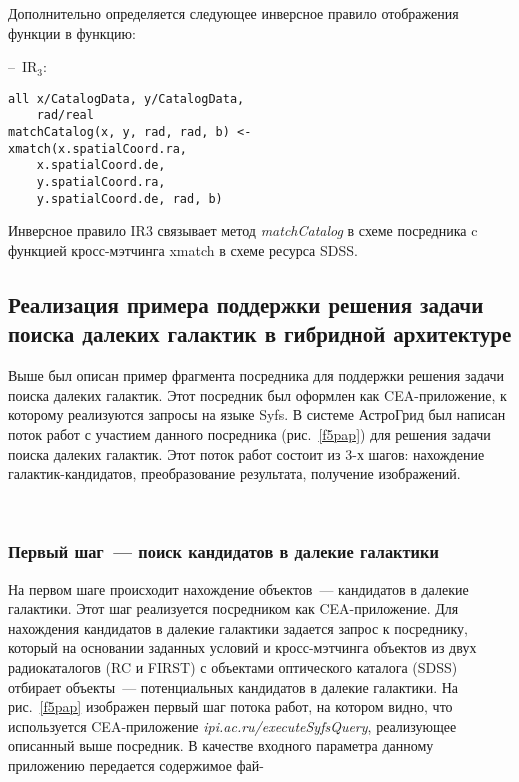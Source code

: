 \begin{multicols}{2}
     Дополнительно определяется следующее инверсное правило отображения
функции в функцию:

--~IR$_3$:
\begin{verbatim}
all x/CatalogData, y/CatalogData,
    rad/real
matchCatalog(x, y, rad, rad, b) <-
xmatch(x.spatialCoord.ra,
    x.spatialCoord.de,
    y.spatialCoord.ra,
    y.spatialCoord.de, rad, b)
\end{verbatim}

     Инверсное правило IR3 связывает метод \textit{matchCatalog} в схеме посредника c
функцией кросс-мэт\-чин\-га xmatch в схеме ресурса SDSS.


\subsection{Реализация примера поддержки решения задачи поиска далеких галактик в
гибридной архитектуре}

     Выше был описан пример фрагмента посредника для поддержки решения задачи
поиска далеких галактик. Этот посредник был оформлен как CEA-при\-ло\-же\-ние, к
которому реализуются запросы на языке Syfs. В системе АстроГрид был написан
поток работ с участием данного посредника (рис.~\ref{f5pap}) для решения задачи поиска
далеких галактик. Этот поток работ состоит из 3-х шагов: нахождение
галактик-кандидатов, преобразование результата, получение изображений.

\begin{figure*}
\vspace*{1pt}
\begin{center}
\mbox{%
\epsfxsize=141.166mm
}
\end{center}
\vspace*{-9pt}
\end{figure*}


\subsubsection{Первый шаг~--- поиск кандидатов в далекие галактики}

     На первом шаге происходит нахождение объектов~--- кандидатов в далекие
галактики. Этот шаг реализуется посредником как CEA-приложение. Для нахождения
кандидатов в далекие галактики задается запрос к посреднику, который на основании
заданных условий и кросс-мэтчинга объектов из двух радиокаталогов (RC и FIRST) с
объектами оптического каталога (SDSS) отбирает объекты~--- потенциальных кандидатов
в далекие галактики.
     На рис.~\ref{f5pap} изображен первый шаг потока работ, на котором видно, что
используется CEA-приложение \textit{ipi.ac.ru/executeSyfsQuery}, реализующее
описанный выше посредник. В качестве входного параметра данному приложению
передается содержимое фай-\linebreak
\vspace*{-12pt}
\pagebreak


\end{multicols}
